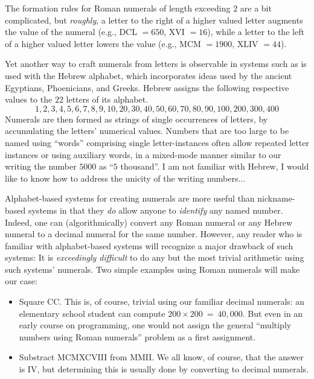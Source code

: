 \noindent
The formation rules for Roman numerals of length exceeding $2$ are a
bit complicated, but {\em roughly}, a letter to the right of a higher
valued letter augments the value of the numeral (e.g., DCL $=650$, XVI
$=16$), while a letter to the left of a higher valued letter lowers
the value (e.g., MCM $=1900$, XLIV $=44$).

Yet another way to craft numerals from letters is observable in
systems such as is used with the Hebrew alphabet, which incorporates
ideas used by the ancient Egyptians, Phoenicians, and Greeks.  Hebrew
assigns the following respective values to the $22$ letters of its
alphabet.
\[ 1, 2, 3, 4, 5, 6, 7, 8, 9, 10,
20, 30, 40, 50, 60, 70, 80, 90, 100,
 200, 300, 400
\]
Numerals are then formed as strings of single occurrences of letters,
by accumulating the letters' numerical values.  Numbers that are too
large to be named using ``words'' comprising single letter-instances
often allow repeated letter instances or using auxiliary words, in a
mixed-mode manner similar to our writing the number $5000$ as ``$5$
thousand''.
{\Denis I am not familiar with Hebrew, I would like to know how to address the unicity of the writing numbers...}

Alphabet-based systems for creating numerals are more useful than
nickname-based systems in that they {\em do} allow anyone to {\em
  identify} any named number. Indeed, one can (algorithmically)
convert any Roman numeral or any Hebrew numeral to a decimal numeral
for the same number.  However, any reader who is familiar with
alphabet-based systems will recognize a major drawback of such
systems: It is {\em exceedingly difficult} to do any but the most
trivial arithmetic using such systems' numerals.  Two simple examples
using Roman numerals will make our case:
\begin{itemize}
\item
Square CC.  This is, of course, trivial using our familiar decimal
numerals: an elementary school student can compute $200 \times 200 \ =
\ 40,000$.  But even in an early course on programming, one would not
assign the general ``multiply numbers using Roman numerals'' problem
as a first assignment.

\item
Substract MCMXCVIII from MMII.  We all know, of course, that the answer
is IV, but determining this is usually done by converting to decimal numerals.
\end{itemize}

